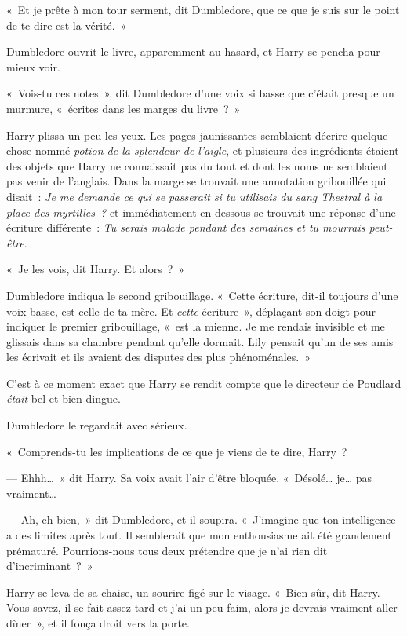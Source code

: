 «~Et je prête à mon tour serment, dit Dumbledore, que ce que je suis sur le point de te dire est la vérité.~»

Dumbledore ouvrit le livre, apparemment au hasard, et Harry se pencha pour mieux voir.

«~Vois-tu ces notes~», dit Dumbledore d'une voix si basse que c'était presque un murmure, «~écrites dans les marges du livre~?~»

Harry plissa un peu les yeux.
Les pages jaunissantes semblaient décrire quelque chose nommé \emph{potion de la splendeur de l'aigle}, et plusieurs des ingrédients étaient des objets que Harry ne connaissait pas du tout et dont les noms ne semblaient pas venir de l'anglais.
Dans la marge se trouvait une annotation gribouillée qui disait~: \emph{Je me demande ce qui se passerait si tu utilisais du sang Thestral à la place des myrtilles~?} et immédiatement en dessous se trouvait une réponse d'une écriture différente~: \emph{Tu serais malade pendant des semaines et tu mourrais peut-être}.

«~Je les vois, dit Harry.
Et alors~?~»

Dumbledore indiqua le second gribouillage.
«~Cette écriture, dit-il toujours d'une voix basse, est celle de ta mère.
Et \emph{cette} écriture~», déplaçant son doigt pour indiquer le premier gribouillage, «~est la mienne.
Je me rendais invisible et me glissais dans sa chambre pendant qu'elle dormait.
Lily pensait qu'un de ses amis les écrivait et ils avaient des disputes des plus phénoménales.~»

C'est à ce moment exact que Harry se rendit compte que le directeur de Poudlard \emph{était} bel et bien dingue.

Dumbledore le regardait avec sérieux.

«~Comprends-tu les implications de ce que je viens de te dire, Harry~?

--- Ehhh…~»
dit Harry.
Sa voix avait l'air d'être bloquée.
«~Désolé… je… pas vraiment…

--- Ah, eh bien,~» dit Dumbledore, et il soupira.
«~J'imagine que ton intelligence a des limites après tout.
Il semblerait que mon enthousiasme ait été grandement prématuré.
Pourrions-nous tous deux prétendre que je n'ai rien dit d'incriminant~?~»

Harry se leva de sa chaise, un sourire figé sur le visage.
«~Bien sûr, dit Harry.
Vous savez, il se fait assez tard et j'ai un peu faim, alors je devrais vraiment aller dîner~», et il fonça droit vers la porte.


